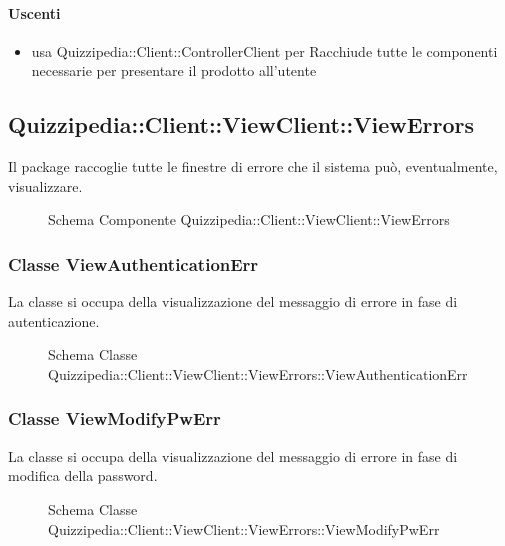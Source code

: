 \paragraph{Uscenti}
\begin{itemize}
\item usa Quizzipedia::Client::ControllerClient per Racchiude tutte le componenti necessarie per presentare il prodotto all'utente
\end{itemize}
\subsection{Quizzipedia::Client::ViewClient::ViewErrors}
Il package raccoglie tutte le finestre di errore che il sistema può, eventualmente, visualizzare.
\begin{figure}[H]
\centering
\noindent{}
\caption[Schema Componente Quizzipedia::Client::ViewClient::ViewErrors]{Schema Componente Quizzipedia::Client::ViewClient::ViewErrors}
\end{figure}
\subsubsection{Classe ViewAuthenticationErr}
La classe si occupa della visualizzazione del messaggio di errore in fase di autenticazione.
\begin{figure}[H]
\centering
\noindent{}
\caption[Schema Classe ViewAuthenticationErr]{Schema Classe Quizzipedia::Client::ViewClient::ViewErrors::ViewAuthenticationErr}
\end{figure}
\subsubsection{Classe ViewModifyPwErr}
La classe si occupa della visualizzazione del messaggio di errore in fase di modifica della password.
\begin{figure}[H]
\centering
\noindent{}
\caption[Schema Classe ViewModifyPwErr]{Schema Classe Quizzipedia::Client::ViewClient::ViewErrors::ViewModifyPwErr}
\end{figure}
